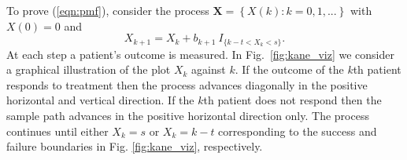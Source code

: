 \documentclass[12pt]{article}
\begin{document}
To prove (\ref{eqn:pmf}), consider the
process $\mathbf{X} = \left\{X(k) : k = 0,1,... \right\}$
with $X(0)=0$ and
\begin{equation*} \label{eqn:proc}
X_{k+1} = X_k + b_{k+1} \ I_{\{ k-t < X_k < s\}}.
\end{equation*}
At each step a patient's outcome is measured. In Fig.~\ref{fig:kane_viz} 
we consider a graphical illustration of the plot $X_k$ against
$k$. If the outcome of the $k$th patient responds to treatment then the process 
advances diagonally in the positive horizontal and vertical direction. 
If the $k$th patient does not respond
then the sample path advances in the positive horizontal direction only. The
process continues until either $X_k = s$ or $X_k = k-t$ corresponding to the
success and failure boundaries in Fig. \ref{fig:kane_viz}, respectively.
\end{document}

